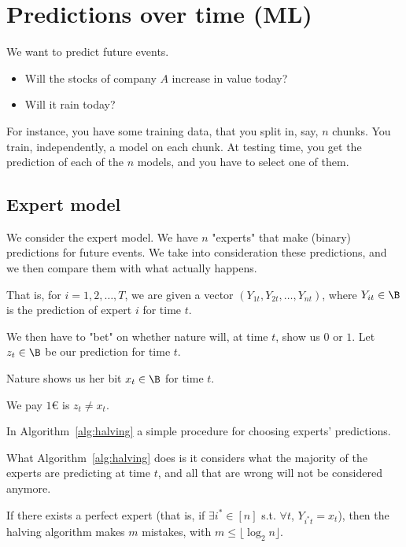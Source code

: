 \section{Predictions over time (ML)}

We want to predict future events.
\begin{itemize}
    \item Will the stocks of company $A$ increase in value today?
    \item Will it rain today?
\end{itemize}

For instance, you have some training data, that you split in, say, $n$ chunks.
You train, independently, a model on each chunk.
At testing time, you get the prediction of each of the $n$ models, and you have to select one of them.


\subsection{Expert model}
    We consider the expert model.
    We have $n$ "experts" that make (binary) predictions for future events. We take into consideration these predictions, and we then compare them with what actually happens.

    That is, for $i = 1, 2, \dots, T$, we are given a vector $(Y_{1t}, Y_{2t}, \dots, Y_{nt})$, where $Y_{it} \in \B$ is the prediction of expert $i$ for time $t$.

    We then have to "bet" on whether nature will, at time $t$, show us $0$ or $1$.
    Let $z_t \in \B$ be our prediction for time $t$.

    Nature shows us her bit $x_t \in \B$ for time $t$.

    We pay $1$€ is $z_t \neq x_t$.

    In Algorithm~\ref{alg:halving} a simple procedure for choosing experts' predictions.

    

    What Algorithm~\ref{alg:halving} does is it considers what the majority of the experts are predicting at time $t$, and all that are wrong will not be considered anymore.

    \begin{theorem}
        If there exists a perfect expert (that is, if $\exists i^* \in [n]$ s.t. $\forall t$, $Y_{i^*t} = x_t$), then the halving algorithm makes $m$ mistakes, with $m \leq \lfloor \log_2 n \rfloor$.
    \end{theorem}

